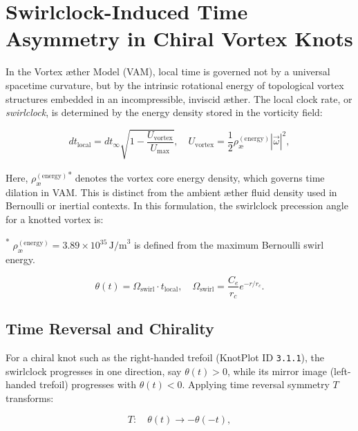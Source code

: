 
\section{Swirlclock-Induced Time Asymmetry in Chiral Vortex Knots}

In the Vortex \ae ther Model (VAM), local time is governed not by a universal spacetime curvature, but by the intrinsic rotational energy of topological vortex structures embedded in an incompressible, inviscid \ae ther. The local clock rate, or \emph{swirlclock}, is determined by the energy density stored in the vorticity field:

\begin{equation}
dt_{\text{local}} = dt_{\infty} \sqrt{1 - \frac{U_{\text{vortex}}}{U_{\text{max}}}}, \quad U_{\text{vortex}} = \frac{1}{2} \rho_\text{\ae}^{(\text{energy})} |\vec{\omega}|^2,
\end{equation}

\noindent
Here, \( \rho_\text{\ae}^{(\text{energy})} \)\textsuperscript{*} denotes the vortex core energy density,
which governs time dilation in VAM. This is distinct from the ambient æther fluid density used in Bernoulli or inertial contexts. In this formulation, the swirlclock precession angle for a knotted vortex is:

\vspace{0.5em}
\noindent\textsuperscript{*}\small
\( \rho_\text{\ae}^{(\text{energy})} = 3.89 \times 10^{35} \, \text{J/m}^3 \)
is defined from the maximum Bernoulli swirl energy.

\begin{equation}
\theta(t) = \Omega_{\text{swirl}} \cdot t_{\text{local}}, \quad \Omega_{\text{swirl}} = \frac{C_e}{r_c} e^{-r/r_c}.
\end{equation}

\subsection{Time Reversal and Chirality}

For a chiral knot such as the right-handed trefoil (KnotPlot ID \texttt{3.1.1}), the swirlclock progresses in one direction, say $\theta(t) > 0$, while its mirror image (left-handed trefoil) progresses with $\theta(t) < 0$. Applying time reversal symmetry $T$ transforms:

\begin{equation}
T: \quad \theta(t) \rightarrow -\theta(-t),
\end{equation}

